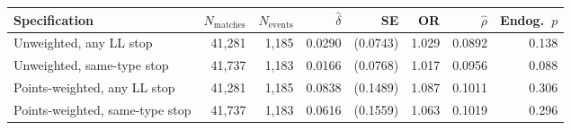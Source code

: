 \begin{tabular}{lrrrrrrr}
\toprule
Specification & $N_{\text{matches}}$ & $N_{\text{events}}$ & $\hat{\delta}$ & SE & OR & $\hat{\rho}$ & Endog.\ $p$ \\
\midrule
Unweighted, any LL stop & 41,281 & 1,185 & 0.0290 & (0.0743) & 1.029 & 0.0892 & 0.138 \\
Unweighted, same-type stop & 41,737 & 1,183 & 0.0166 & (0.0768) & 1.017 & 0.0956 & 0.088 \\
Points-weighted, any LL stop & 41,281 & 1,185 & 0.0838 & (0.1489) & 1.087 & 0.1011 & 0.306 \\
Points-weighted, same-type stop & 41,737 & 1,183 & 0.0616 & (0.1559) & 1.063 & 0.1019 & 0.296 \\
\bottomrule
\end{tabular}
